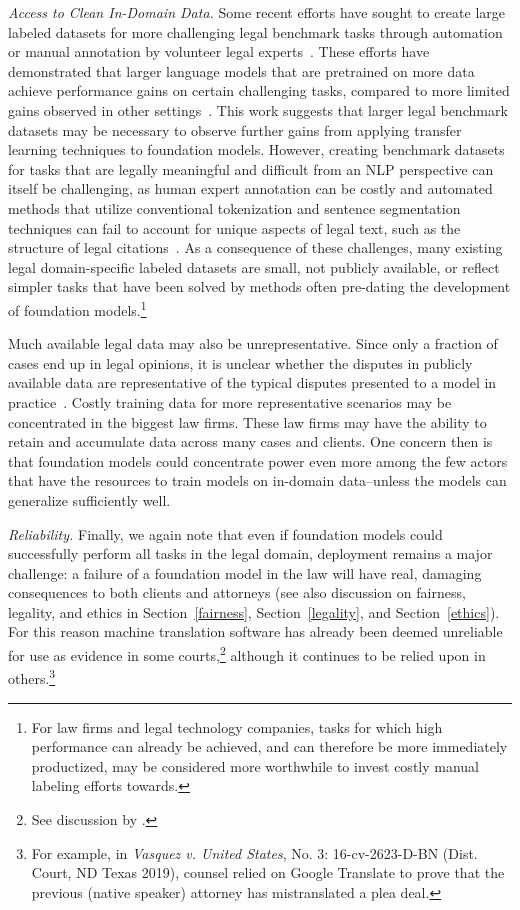 \emph{Access to Clean In-Domain Data.} Some recent efforts have sought to create large labeled datasets for more challenging legal benchmark tasks through automation~\citep{zheng2021does} or manual annotation by volunteer legal experts~\citep{hendrycks2021cuad}. These efforts have demonstrated that larger language models that are pretrained on more data achieve performance gains on certain challenging tasks, compared to more limited gains observed in other settings~\citep{chalkidis2020legal, elwany2019bert, zhong2020does}. This work suggests that larger legal benchmark datasets may be necessary to observe further gains from applying transfer learning techniques to foundation models. However, creating benchmark datasets for tasks that are legally meaningful and difficult from an NLP perspective can itself be challenging, as human expert annotation can be costly and automated methods that utilize conventional tokenization and sentence segmentation techniques can fail to account for unique aspects of legal text, such as the structure of legal citations~\citep{bommarito2018lexnlp,savelka2017sentence}. As a consequence of these challenges, many existing legal domain-specific labeled datasets are small, not publicly available, or reflect simpler tasks that have been solved by methods often pre-dating the development of foundation models.\footnote{For law firms and legal technology companies, tasks for which high performance can already be achieved, and can therefore be more immediately productized, may be considered more worthwhile to invest costly manual labeling efforts towards.}

Much available legal data may also be unrepresentative. Since only a fraction of cases end up in legal opinions, it is unclear whether the disputes in publicly available data are representative of the typical disputes presented to a model in practice~\citep{priest1984selection}. Costly training data for more representative scenarios may be concentrated in the biggest law firms. These law firms may have the ability to retain and accumulate data across many cases and clients. One concern then is that foundation models could concentrate power even more among the few actors that have the resources to train models on in-domain data--unless the models can generalize sufficiently well.
\medskip

\emph{Reliability.} Finally, we again note that even if foundation models could successfully perform all tasks in the legal domain, deployment remains a major challenge: a failure of a foundation model in the law will have real, damaging consequences to both clients and attorneys (see also discussion on fairness, legality, and ethics in Section~\ref{fairness}, Section~\ref{legality}, and Section~\ref{ethics}).
For this reason machine translation software has already been deemed unreliable for use as evidence in some courts,\footnote{See discussion by \citet{vieira2020understanding}.} although it continues to be relied upon in others.\footnote{For example, in \textit{Vasquez v. United States}, No. 3: 16-cv-2623-D-BN (Dist. Court, ND Texas 2019), counsel relied on Google Translate to prove that the previous (native speaker) attorney has mistranslated a plea deal.}

